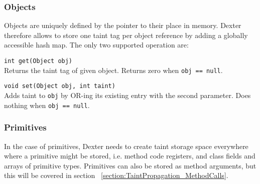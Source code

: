 \documentclass[12pt,twoside,notitlepage]{report}
\begin{document}
\subsubsection{Objects}

Objects are uniquely defined by the pointer to their place in memory. Dexter therefore allows to store one taint tag per object reference by adding a globally accessible hash map. The only two supported operation are:
\begin{description} 
\item \verb$int get(Object obj)$ \\
Returns the taint tag of given object. Returns zero when \verb$obj == null$.
\item \verb$void set(Object obj, int taint)$ \\
Adds taint to \verb$obj$ by OR-ing its existing entry with the second parameter. Does nothing when \verb$obj == null$.
\end{description}

\subsubsection{Primitives}

\label{section:TaintStorage_Primitives}

In the case of primitives, Dexter needs to create taint storage space everywhere where a primitive might be stored, i.e. method code registers, and class fields and arrays of primitive types. Primitives can also be stored as method arguments, but this will be covered in section ~\ref{section:TaintPropagation_MethodCalls}.
\end{document}
